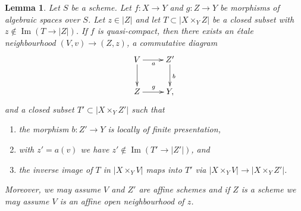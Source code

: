\documentclass{stacks-project}
\theoremstyle{plain}
\newtheorem{lemma}[subsection]{Lemma}
\theoremstyle{definition}
\theoremstyle{remark}
\numberwithin{equation}{subsection}
\def\Im{\mathop{\mathrm{Im}}}
\begin{document}
\begin{lemma}
\label{lemma-separate}
Let $S$ be a scheme. Let $f : X \to Y$ and $g : Z \to Y$ be
morphisms of algebraic spaces over $S$. Let $z \in |Z|$ and let
$T \subset |X \times_Y Z|$ be a closed subset
with $z \not \in \Im(T \to |Z|)$.
If $f$ is quasi-compact, then there exists
an \'etale neighbourhood $(V, v) \to (Z, z)$,
a commutative diagram
$$
\xymatrix{
V \ar[d] \ar[r]_a & Z' \ar[d]^b \\
Z \ar[r]^g & Y,
}
$$
and a closed subset $T' \subset |X \times_Y Z'|$ such that
\begin{enumerate}
\item the morphism $b : Z' \to Y$ is locally of finite presentation,
\item with $z' = a(v)$ we have $z' \not \in \Im(T' \to |Z'|)$, and
\item the inverse image of $T$ in $|X \times_Y V|$
maps into $T'$ via $|X \times_Y V| \to |X \times_Y Z'|$.
\end{enumerate}
Moreover, we may assume $V$ and $Z'$ are affine schemes and if $Z$
is a scheme we may assume $V$ is an affine open neighbourhood of $z$.
\end{lemma}
\end{document}
